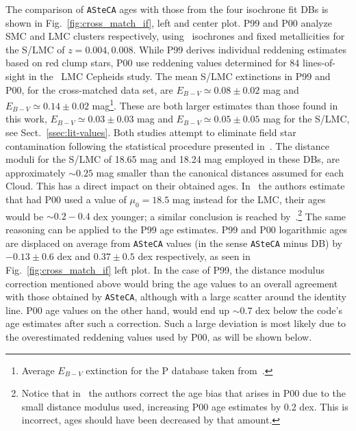 \documentclass[draft]{aa}
\begin{document}
%
%
The comparison of \texttt{ASteCA} ages with those from the four isochrone
fit DBs is shown in Fig.~\ref{fig:cross_match_if}, left and center plot.
%
P99 and P00 analyze SMC and LMC clusters respectively,
using~\cite{Bertelli_1994} isochrones and fixed metallicities for the S/LMC of
$z{=}0.004, 0.008$. While P99 derives individual reddening estimates based on
red clump stars, P00 use reddening values determined for 84 lines-of-sight
in the~\cite{Udalski_1999} LMC Cepheids study. The mean S/LMC extinctions in P99
and P00, for the cross-matched data set, are $E_{B-V}{\simeq}0.08{\pm}0.02$ mag
and $E_{B-V}{\simeq}0.14 {\pm}0.02$ mag\footnote{Average $E_{B-V}$ extinction
for the P database taken from~\cite{de_Grijs_2006}.}. These are both larger
estimates than those found in this work, $E_{B-V}{\simeq}0.03{\pm}0.03$ mag and
$E_{B-V}{\simeq}0.05{\pm}0.05$ mag for the S/LMC, see
Sect.~\ref{ssec:lit-values}.
%
Both studies attempt to eliminate field star contamination following the
statistical procedure presented in~\cite{Mateo_1986}.
The distance moduli for the S/LMC of 18.65 mag and 18.24 mag employed in
these DBs, are approximately ${\sim}0.25$ mag smaller than the canonical
distances assumed for each Cloud. This has a direct impact on their obtained
ages.
%
In~\cite{de_Grijs_2006} the authors estimate that had P00 used a value
of $\mu_0{=}18.5$ mag instead for the LMC, their ages would be ${\sim}0.2{-}0.4$
dex younger; a similar conclusion is reached
by~\cite{Baumgardt_2013}.\footnote{Notice that in~\cite{Baumgardt_2013} the
authors correct the age bias that arises in P00 due to the small distance
modulus used, increasing P00 age estimates by 0.2 dex. This is incorrect, ages
should have been decreased by that amount.} The same reasoning can be applied to
the P99 age estimates.\@
%
P99 and P00 logarithmic ages are displaced on average from \texttt{ASteCA}
values (in the sense \texttt{ASteCA} minus DB) by $-0.13{\pm}0.6$ dex and $0.37
{\pm}0.5$ dex respectively, as seen in Fig.~\ref{fig:cross_match_if} left plot.
In the case of P99, the distance modulus correction mentioned above would
bring the age values to an overall agreement with those obtained by
\texttt{ASteCA}, although with a large scatter around the identity line.
%
P00 age values on the other hand, would end up ${\sim}0.7$ dex below the code's
age estimates after such a correction. Such a large deviation is most likely due
to the overestimated reddening values used by P00, as will be shown below.
\end{document}
